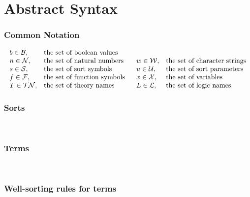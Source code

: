 \chapter{Abstract Syntax}\label{app:abstract-syntax}
\thispagestyle{empty}

{\small

\subsection*{Common Notation}
\smallskip


\[
\begin{array}{llll}
b \in \mathcal{B}, & \text{the set of boolean values} \\
n \in \mathcal{N}, & \text{the set of natural numbers}  &
w \in \mathcal{W}, & \text{the set of character strings} \\
s \in \mathcal{S}, & \text{the set of sort symbols} &
u \in \mathcal{U}, & \text{the set of sort parameters} \\
f \in \mathcal{F}, & \text{the set of function symbols\ \ } &
x \in \mathcal{X}, & \text{the set of variables} \\
T \in \mathcal{TN}, & \text{the set of theory names} &
L \in \mathcal{L}, & \text{the set of logic names}
\end{array}
\]

\subsection*{Sorts}
\ 

\sortterms


\subsection*{Terms}
\ 

\terms


\newpage
\subsection*{Well-sorting rules for terms}

}
